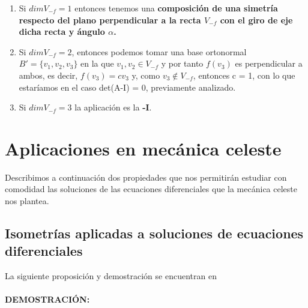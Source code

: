 \documentclass[10pt,a4paper]{article}
\theoremstyle{mystyle}
\newtheorem{prop}{\textcolor{green}{\textbf{Proposición}}}
\begin{document}
\begin{enumerate}
\item Si $dimV_{-f} = 1$ entonces tenemos una \textbf{composición de una simetría respecto del plano perpendicular a la recta $V_{-f}$ con el giro de eje dicha recta y ángulo $\alpha$.}
\item Si $dimV_{-f} = 2$, entonces podemos tomar una base ortonormal $B' = \lbrace v_1,v_2,v_3 \rbrace$ en la que $v_1,v_2 \in V_{-f}$ y por tanto $f(v_3)$ es perpendicular a ambos, es decir, $f(v_3) = cv_3$ y, como $v_3 \notin V_{-f}$, entonces c = 1, con lo que estaríamos en el caso det(A-I) = 0, previamente analizado.
\item Si $dimV_{-f} = 3$ la aplicación es la \textbf{-I}.
\end{enumerate}

\section{Aplicaciones en mecánica celeste}

Describimos a continuación dos propiedades que nos permitirán estudiar con comodidad las soluciones de las ecuaciones diferenciales que la mecánica celeste nos plantea.

\subsection{Isometrías aplicadas a soluciones de ecuaciones diferenciales}

La siguiente proposición y demostración se encuentran en \cite{celeste}\\

\hfill \\

\textbf{DEMOSTRACIÓN:}\\
\end{document}
